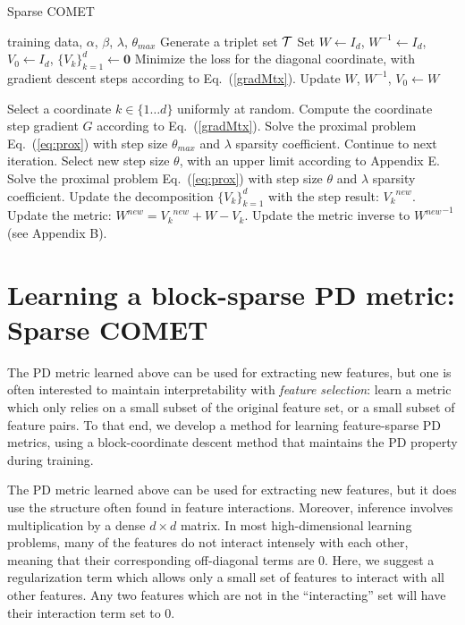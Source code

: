 \documentclass[twoside,11pt]{article}
\newcommand\mat[1]{{#1}}
\renewcommand\vec[1]{\mathbf{#1}}
\newcommand{\W}{\mat{W}}
\newcommand{\newW}{{\mat{W^{new}}}}
\newcommand{\Vk}{\mat{V_k}}
\newcommand{\Vz}{\mat{V_0}}
\newcommand{\Vgrc}{\{\Vk\}_{k=1}^{d}} %
\newcommand{\cholL}{\mat{L}}
\renewcommand{\eqref}[1]{Eq.~(\ref{#1})}
\begin{document}
\begin{algorithm}[t]
   \caption{Sparse COMET}
   \label{alg:spcomet}
\begin{algorithmic}[1]
    training data, $\alpha$, $\beta$, $\lambda$, $\theta_{max}$
   \STATE Generate a triplet set $\cal{T}$
   \STATE Set  $\W  \leftarrow I_d$, $\W^{-1}  \leftarrow I_d$, $\Vz   \leftarrow I_d$, $\Vgrc \leftarrow \vec{0}$
   \STATE Minimize the loss for the diagonal coordinate, with gradient descent steps according to  \eqref{gradMtx}.
   \STATE Update $\W$, $\W^{-1}$, $\Vz \leftarrow \W$
    
   \REPEAT 
   \STATE Select a coordinate $k \in \{1 \ldots d\}$ uniformly at random.
   \STATE Compute the coordinate step gradient $\mat{G}$ according to \eqref{gradMtx}.
   \STATE Solve the proximal problem \eqref{eq:prox} with step size $\theta_{max}$ and $\lambda$ sparsity coefficient.
     \STATE Continue to next iteration.
   \ELSE 
      \STATE Select new step size $\theta$, with an upper limit according to Appendix E.
       \STATE Solve the proximal problem \eqref{eq:prox} with step size $\theta$ and $\lambda$ sparsity coefficient.
      \STATE Update the decomposition $\Vgrc$ with the step result: $\Vk^{new}$.
      \STATE Update the metric: $\newW = \Vk^{new} + \W - \Vk$.
       \STATE Update the metric inverse to $\newW^{-1}$ (see Appendix B).
    \ENDIF
\end{algorithmic}
\end{algorithm}

\section{Learning a block-sparse PD metric: Sparse COMET}
The PD metric learned above can be used for extracting new features, but one is often interested to maintain interpretability with \emph{feature selection}: learn a metric which only relies on a small subset of the original feature set, or a small subset of feature pairs. To that end, we develop a method for learning feature-sparse PD metrics, using a block-coordinate descent method that maintains the PD property during training.

The PD metric learned above can be used for extracting new features, but it does use the structure often found in feature interactions. Moreover, inference involves multiplication by a dense $d \times d$ matrix. In most high-dimensional learning problems, many of the features do not interact intensely with each other, meaning that their corresponding off-diagonal terms are $0$. Here, we suggest a regularization term which allows only a small set of features to interact with all other features. Any two features which are not in the ``interacting'' set will have their interaction term set to $0$.
\end{document}
